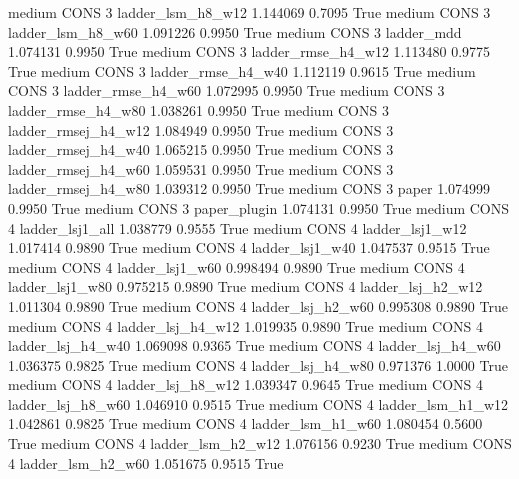     medium     CONS                 3   ladder_lsm_h8_w12   1.144069      0.7095    True
    medium     CONS                 3   ladder_lsm_h8_w60   1.091226      0.9950    True
    medium     CONS                 3          ladder_mdd   1.074131      0.9950    True
    medium     CONS                 3  ladder_rmse_h4_w12   1.113480      0.9775    True
    medium     CONS                 3  ladder_rmse_h4_w40   1.112119      0.9615    True
    medium     CONS                 3  ladder_rmse_h4_w60   1.072995      0.9950    True
    medium     CONS                 3  ladder_rmse_h4_w80   1.038261      0.9950    True
    medium     CONS                 3 ladder_rmsej_h4_w12   1.084949      0.9950    True
    medium     CONS                 3 ladder_rmsej_h4_w40   1.065215      0.9950    True
    medium     CONS                 3 ladder_rmsej_h4_w60   1.059531      0.9950    True
    medium     CONS                 3 ladder_rmsej_h4_w80   1.039312      0.9950    True
    medium     CONS                 3               paper   1.074999      0.9950    True
    medium     CONS                 3        paper_plugin   1.074131      0.9950    True
    medium     CONS                 4     ladder_lsj1_all   1.038779      0.9555    True
    medium     CONS                 4     ladder_lsj1_w12   1.017414      0.9890    True
    medium     CONS                 4     ladder_lsj1_w40   1.047537      0.9515    True
    medium     CONS                 4     ladder_lsj1_w60   0.998494      0.9890    True
    medium     CONS                 4     ladder_lsj1_w80   0.975215      0.9890    True
    medium     CONS                 4   ladder_lsj_h2_w12   1.011304      0.9890    True
    medium     CONS                 4   ladder_lsj_h2_w60   0.995308      0.9890    True
    medium     CONS                 4   ladder_lsj_h4_w12   1.019935      0.9890    True
    medium     CONS                 4   ladder_lsj_h4_w40   1.069098      0.9365    True
    medium     CONS                 4   ladder_lsj_h4_w60   1.036375      0.9825    True
    medium     CONS                 4   ladder_lsj_h4_w80   0.971376      1.0000    True
    medium     CONS                 4   ladder_lsj_h8_w12   1.039347      0.9645    True
    medium     CONS                 4   ladder_lsj_h8_w60   1.046910      0.9515    True
    medium     CONS                 4   ladder_lsm_h1_w12   1.042861      0.9825    True
    medium     CONS                 4   ladder_lsm_h1_w60   1.080454      0.5600    True
    medium     CONS                 4   ladder_lsm_h2_w12   1.076156      0.9230    True
    medium     CONS                 4   ladder_lsm_h2_w60   1.051675      0.9515    True
